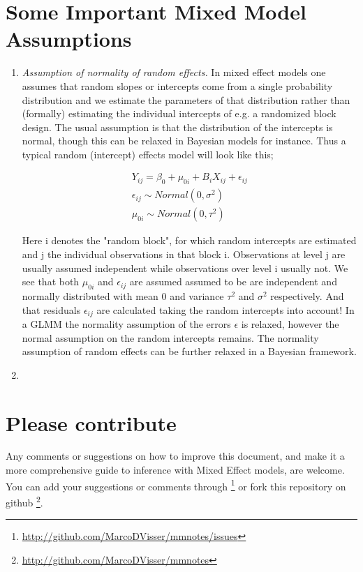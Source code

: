 \documentclass{article}\usepackage[]{graphicx}\usepackage[]{color}
\numberwithin{equation}{section} %
\numberwithin{figure}{section} %
\numberwithin{table}{section} %
\begin{document}
\section{Some Important Mixed Model Assumptions}
\begin{enumerate}
\item \textit{Assumption of normality of random effects.} In mixed effect models one assumes that random slopes or intercepts come from a single probability distribution and we estimate the parameters of that distribution rather than (formally) estimating the individual intercepts of e.g. a randomized block design. The usual assumption is that the distribution of the intercepts is normal, though this can be relaxed in Bayesian models for instance. Thus a typical random (intercept) effects model will look like this;

\begin{equation}
\begin{split}
Y_{ij}  = \beta_{0}+\mu_{0i}+B_i X_{ij} + \epsilon_{ij} \\
\epsilon_{ij} \sim Normal(0,\sigma^2) \\
\mu_{0i} \sim Normal(0,\tau^2)
\end{split}
\end{equation}

Here i denotes the "random block", for which random intercepts are estimated and j the individual observations in that block i. Observations at level j are usually assumed independent while observations over level i usually not. We see that both $\mu_{0i}$ and $\epsilon_{ij}$ are assumed assumed to be are independent and normally distributed with mean 0 and variance $\tau^2$ and $\sigma^2$ respectively. And that residuals $\epsilon_{ij}$ are calculated taking the random intercepts into account! In a GLMM the normality assumption of the errors $\epsilon$ is relaxed, however the normal assumption on the random intercepts remains. The normality assumption of random effects can be further relaxed in a Bayesian framework.

\item 
\end{enumerate}


\section{Please contribute}
Any comments or suggestions on how to improve this document, and make it a more comprehensive guide to inference with Mixed Effect models, are welcome. You can add your suggestions or comments through \footnote{\url{http://github.com/MarcoDVisser/mmnotes/issues}} or fork this repository on github \footnote{\url{http://github.com/MarcoDVisser/mmnotes}}.

    
    
\end{document}
